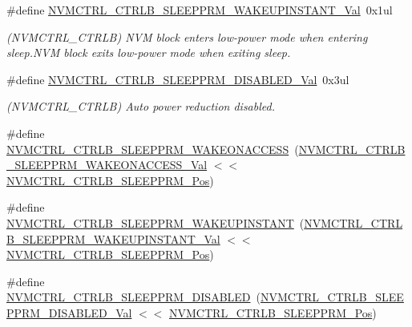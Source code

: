 \begin{DoxyCompactItemize}
\#define \mbox{\hyperlink{group___s_a_m_d21___n_v_m_c_t_r_l_ga45d3a8b31b16b2b1204de0b61e5c12fc}{N\+V\+M\+C\+T\+R\+L\+\_\+\+C\+T\+R\+L\+B\+\_\+\+S\+L\+E\+E\+P\+P\+R\+M\+\_\+\+W\+A\+K\+E\+U\+P\+I\+N\+S\+T\+A\+N\+T\+\_\+\+Val}}~0x1ul
\begin{DoxyCompactList}\small\item\em (N\+V\+M\+C\+T\+R\+L\+\_\+\+C\+T\+R\+LB) N\+VM block enters low-\/power mode when entering sleep.\+N\+VM block exits low-\/power mode when exiting sleep. \end{DoxyCompactList}\item 
\#define \mbox{\hyperlink{group___s_a_m_d21___n_v_m_c_t_r_l_ga2a6e0082abe992f41fe1e646e0b6b52a}{N\+V\+M\+C\+T\+R\+L\+\_\+\+C\+T\+R\+L\+B\+\_\+\+S\+L\+E\+E\+P\+P\+R\+M\+\_\+\+D\+I\+S\+A\+B\+L\+E\+D\+\_\+\+Val}}~0x3ul
\begin{DoxyCompactList}\small\item\em (N\+V\+M\+C\+T\+R\+L\+\_\+\+C\+T\+R\+LB) Auto power reduction disabled. \end{DoxyCompactList}\item 
\#define \mbox{\hyperlink{group___s_a_m_d21___n_v_m_c_t_r_l_ga65e9f8270f7eaf6119d83c67049d63cc}{N\+V\+M\+C\+T\+R\+L\+\_\+\+C\+T\+R\+L\+B\+\_\+\+S\+L\+E\+E\+P\+P\+R\+M\+\_\+\+W\+A\+K\+E\+O\+N\+A\+C\+C\+E\+SS}}~(\mbox{\hyperlink{group___s_a_m_d21___n_v_m_c_t_r_l_gaa1ab6787e59eac433c25ac307dd7a2aa}{N\+V\+M\+C\+T\+R\+L\+\_\+\+C\+T\+R\+L\+B\+\_\+\+S\+L\+E\+E\+P\+P\+R\+M\+\_\+\+W\+A\+K\+E\+O\+N\+A\+C\+C\+E\+S\+S\+\_\+\+Val}} $<$$<$ \mbox{\hyperlink{group___s_a_m_d21___n_v_m_c_t_r_l_gac7d2e32d78d79b7a7b67e1f6aa1571df}{N\+V\+M\+C\+T\+R\+L\+\_\+\+C\+T\+R\+L\+B\+\_\+\+S\+L\+E\+E\+P\+P\+R\+M\+\_\+\+Pos}})
\item 
\#define \mbox{\hyperlink{group___s_a_m_d21___n_v_m_c_t_r_l_ga6c32d4daa17d08d810b673df9bf3a3bf}{N\+V\+M\+C\+T\+R\+L\+\_\+\+C\+T\+R\+L\+B\+\_\+\+S\+L\+E\+E\+P\+P\+R\+M\+\_\+\+W\+A\+K\+E\+U\+P\+I\+N\+S\+T\+A\+NT}}~(\mbox{\hyperlink{group___s_a_m_d21___n_v_m_c_t_r_l_ga45d3a8b31b16b2b1204de0b61e5c12fc}{N\+V\+M\+C\+T\+R\+L\+\_\+\+C\+T\+R\+L\+B\+\_\+\+S\+L\+E\+E\+P\+P\+R\+M\+\_\+\+W\+A\+K\+E\+U\+P\+I\+N\+S\+T\+A\+N\+T\+\_\+\+Val}} $<$$<$ \mbox{\hyperlink{group___s_a_m_d21___n_v_m_c_t_r_l_gac7d2e32d78d79b7a7b67e1f6aa1571df}{N\+V\+M\+C\+T\+R\+L\+\_\+\+C\+T\+R\+L\+B\+\_\+\+S\+L\+E\+E\+P\+P\+R\+M\+\_\+\+Pos}})
\item 
\#define \mbox{\hyperlink{group___s_a_m_d21___n_v_m_c_t_r_l_gab612ef2163b9b3f3b243a5a58ebbada0}{N\+V\+M\+C\+T\+R\+L\+\_\+\+C\+T\+R\+L\+B\+\_\+\+S\+L\+E\+E\+P\+P\+R\+M\+\_\+\+D\+I\+S\+A\+B\+L\+ED}}~(\mbox{\hyperlink{group___s_a_m_d21___n_v_m_c_t_r_l_ga2a6e0082abe992f41fe1e646e0b6b52a}{N\+V\+M\+C\+T\+R\+L\+\_\+\+C\+T\+R\+L\+B\+\_\+\+S\+L\+E\+E\+P\+P\+R\+M\+\_\+\+D\+I\+S\+A\+B\+L\+E\+D\+\_\+\+Val}} $<$$<$ \mbox{\hyperlink{group___s_a_m_d21___n_v_m_c_t_r_l_gac7d2e32d78d79b7a7b67e1f6aa1571df}{N\+V\+M\+C\+T\+R\+L\+\_\+\+C\+T\+R\+L\+B\+\_\+\+S\+L\+E\+E\+P\+P\+R\+M\+\_\+\+Pos}})
$$
\end{DoxyCompactItemize}
